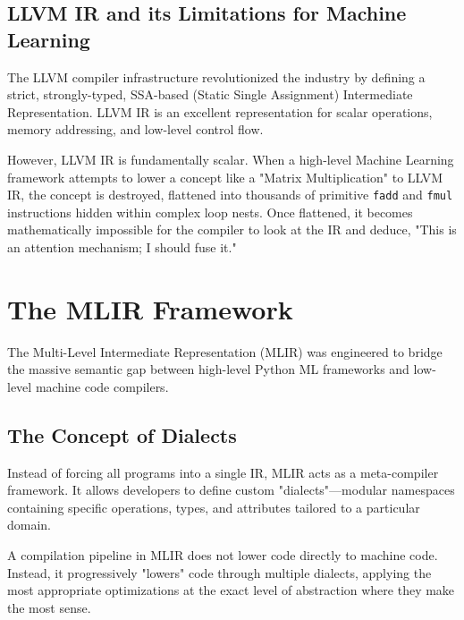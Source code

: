 \subsection{LLVM IR and its Limitations for Machine Learning}
The LLVM compiler infrastructure revolutionized the industry by defining a strict, strongly-typed, SSA-based (Static Single Assignment) Intermediate Representation. LLVM IR is an excellent representation for scalar operations, memory addressing, and low-level control flow.

However, LLVM IR is fundamentally scalar. When a high-level Machine Learning framework attempts to lower a concept like a "Matrix Multiplication" to LLVM IR, the concept is destroyed, flattened into thousands of primitive \texttt{fadd} and \texttt{fmul} instructions hidden within complex loop nests. Once flattened, it becomes mathematically impossible for the compiler to look at the IR and deduce, "This is an attention mechanism; I should fuse it."

\section{The MLIR Framework}
The Multi-Level Intermediate Representation (MLIR) \cite{lattner2020mlir} was engineered to bridge the massive semantic gap between high-level Python ML frameworks and low-level machine code compilers. 

\subsection{The Concept of Dialects}
Instead of forcing all programs into a single IR, MLIR acts as a meta-compiler framework. It allows developers to define custom "dialects"—modular namespaces containing specific operations, types, and attributes tailored to a particular domain.

A compilation pipeline in MLIR does not lower code directly to machine code. Instead, it progressively "lowers" code through multiple dialects, applying the most appropriate optimizations at the exact level of abstraction where they make the most sense. 

